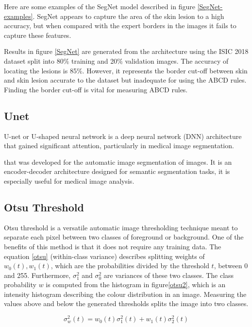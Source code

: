 Here are some examples of the SegNet model described in figure \ref{SegNet-examples}. SegNet appears to capture the area of the skin lesion to a high accuracy, but when compared with the expert borders in the images it fails to capture these features.

Results in figure \ref{SegNet} are generated from the architecture using the ISIC 2018 dataset split into 80\% training and 20\% validation images. The accuracy of locating the lesions is 85\%. However, it represents the border cut-off between skin and skin lesion accurate to the dataset but inadequate for using the ABCD rules. Finding the border cut-off is vital for measuring ABCD rules\cite{Pereira2020}.

\subsection{Unet}
U-net or U-shaped neural network is a deep neural network (DNN) architecture that gained significant attention, particularly in medical image segmentation. 

that was developed for the automatic image segmentation of images. It is an encoder-decoder architecture designed for semantic segmentation tasks, it is especially useful for medical image analysis\cite{zhou2020}.  

\subsection{Otsu Threshold}
Otsu threshold is a versatile automatic image thresholding technique meant to separate each pixel between two classes of foreground or background. One of the benefits of this method is that it does not require any training data. The equation \ref{otsu} (within-class variance) describes splitting weights of $w_0(t),w_1(t)$, which are the probabilities divided by the threshold $t$, between 0 and 255. Furthermore, $\sigma_1^2$ and $\sigma_0^2$ are variances of these two classes. The class probability $w$ is computed from the histogram in figure\ref{otsu2}, which is an intensity histogram describing the colour distribution in an image. Measuring the values above and below the generated thresholds splits the image into two classes.

\begin{equation}
\sigma_w^2(t) = w_0(t)\sigma_1^2(t) + w_1(t)\sigma_2^2(t)
\end{equation}\label{otsu}

